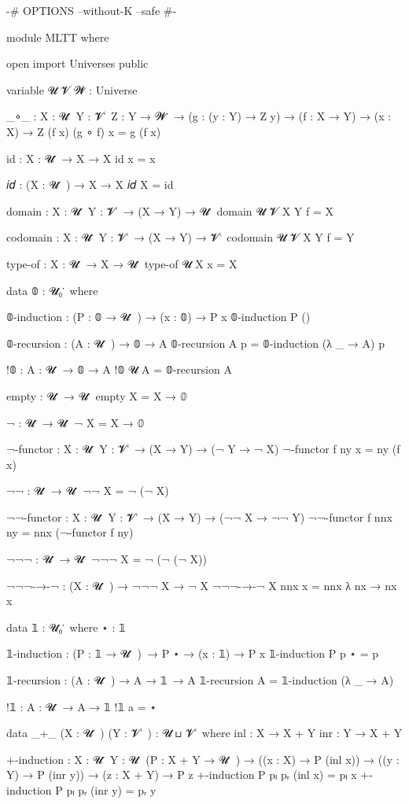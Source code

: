 {-# OPTIONS --without-K --safe #-}

module MLTT where

open import Universes public

variable 𝓤 𝓥 𝓦 : Universe 

_∘_ : {X : 𝓤 ̇ } {Y : 𝓥 ̇ } {Z : Y → 𝓦 ̇ }
    → (g : (y : Y) → Z y)
    → (f : X → Y)
    → (x : X) → Z (f x)
(g ∘ f) x = g (f x) 

id : {X : 𝓤 ̇ } → X → X 
id x = x

𝑖𝑑 : (X : 𝓤 ̇ ) → X → X 
𝑖𝑑 X = id

domain : {X : 𝓤 ̇ } {Y : 𝓥 ̇ } → (X → Y) → 𝓤 ̇
domain {𝓤} {𝓥} {X} {Y} f = X

codomain : {X : 𝓤 ̇ } {Y : 𝓥 ̇ } → (X → Y) → 𝓥 ̇
codomain {𝓤} {𝓥} {X} {Y} f = Y

type-of : {X : 𝓤 ̇ } → X → 𝓤 ̇
type-of {𝓤} {X} x = X 

data 𝟘 : 𝓤₀ ̇ where

𝟘-induction : (P : 𝟘 → 𝓤 ̇ ) → (x : 𝟘) → P x 
𝟘-induction P ()

𝟘-recursion : (A : 𝓤 ̇ ) → 𝟘 → A 
𝟘-recursion A p = 𝟘-induction (λ _ → A) p

!𝟘 : {A : 𝓤 ̇ } → 𝟘 → A 
!𝟘 {𝓤} {A} = 𝟘-recursion A

empty : 𝓤 ̇ → 𝓤 ̇ 
empty X = X → 𝟘

¬ : 𝓤 ̇ → 𝓤 ̇
¬ X = X → 𝟘

¬-functor : {X : 𝓤 ̇ } {Y : 𝓥 ̇ } → (X → Y) → (¬ Y → ¬ X)
¬-functor f ny x = ny (f x)

¬¬ : 𝓤 ̇ → 𝓤 ̇ 
¬¬ X = ¬ (¬ X)

¬¬-functor : {X : 𝓤 ̇ } {Y : 𝓥 ̇ } → (X → Y) → (¬¬ X → ¬¬ Y)
¬¬-functor f nnx ny = nnx (¬-functor f ny)

¬¬¬ : 𝓤 ̇ → 𝓤 ̇
¬¬¬ X = ¬ (¬ (¬ X))

¬¬¬-→-¬ : (X : 𝓤 ̇ ) → ¬¬¬ X → ¬ X
¬¬¬-→-¬ X nnx x = nnx λ nx → nx x

data 𝟙 : 𝓤₀ ̇ where
    ⋆ : 𝟙

𝟙-induction : (P : 𝟙 → 𝓤 ̇ ) → P ⋆ → (x : 𝟙) → P x 
𝟙-induction P p ⋆ = p

𝟙-recursion : (A : 𝓤 ̇ ) → A → 𝟙 → A
𝟙-recursion A = 𝟙-induction (λ _ → A)

!𝟙 : {A : 𝓤 ̇ } → A → 𝟙
!𝟙 a = ⋆

data _+_ (X : 𝓤 ̇ ) (Y : 𝓥 ̇ ) : 𝓤 ⊔ 𝓥 ̇ where
    inl : X → X + Y 
    inr : Y → X + Y 

+-induction : {X : 𝓤 ̇ } {Y : 𝓤 ̇ } (P : X + Y → 𝓤 ̇ )
            → ((x : X) → P (inl x))
            → ((y : Y) → P (inr y))
            → (z : X + Y) → P z
+-induction P pₗ pᵣ (inl x) = pₗ x
+-induction P pₗ pᵣ (inr y) = pᵣ y

